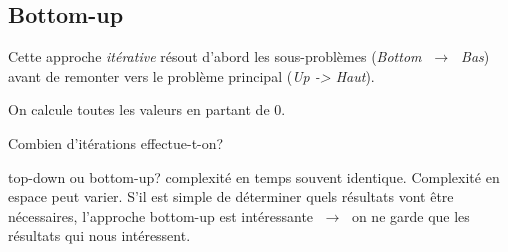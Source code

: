 \documentclass[a4paper,11pt]{article}
\begin{document}
\subsection{Bottom-up}
Cette approche \emph{itérative} résout d'abord les sous-problèmes (\emph{Bottom $\;\rightarrow\;$ Bas}) avant de remonter vers le problème principal (\emph{Up -> Haut}).
\begin{center}
    
    \label{moncode}
\end{center}
On calcule toutes les valeurs en partant de 0.

\begin{activite}
    Combien d'itérations effectue-t-on?
\end{activite}
\begin{commentprof}
top-down ou bottom-up? complexité en temps souvent identique. Complexité en espace peut varier. S'il est simple de déterminer quels résultats vont être nécessaires, l'approche bottom-up est intéressante $\;\rightarrow\;$ on ne garde que les résultats qui nous intéressent.
\end{commentprof}
\end{document}
